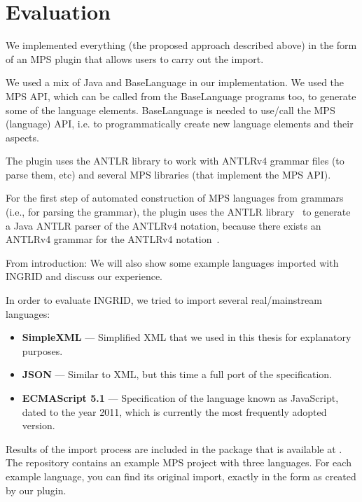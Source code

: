 \section{Evaluation}
\label{sect:EVAL}


We implemented everything (the proposed approach described above) in the form of an MPS plugin that allows users to carry out the import.

We used a mix of Java and BaseLanguage in our implementation.
We used the MPS API, which can be called from the BaseLanguage programs too, to generate some of the language elements.
BaseLanguage is needed to use/call the MPS (language) API, i.e. to programmatically create new language elements and their aspects.

The plugin uses the ANTLR library to work with ANTLRv4 grammar files (to parse them, etc) and several MPS libraries (that implement the MPS API).

For the first step of automated construction of MPS languages from grammars (i.e., for parsing the grammar), the plugin uses the ANTLR library~\cite{ref:ANTLR4} to generate a Java ANTLR parser of the ANTLRv4 notation, because there exists an ANTLRv4 grammar for the ANTLRv4 notation~\cite{ref:ANTLR4reference}.



From introduction: We will also show some example languages imported with INGRID and discuss our experience.

In order to evaluate INGRID, we tried to import several real/mainstream languages:
\begin{itemize}
	\item \textbf{SimpleXML} --- Simplified XML that we used in this thesis for explanatory purposes.
	\item \textbf{JSON} --- Similar to XML, but this time a full port of the specification.
	\item \textbf{ECMAScript 5.1} --- Specification of the language known as JavaScript, dated to the year 2011, which is currently the most frequently adopted version.
\end{itemize}
Results of the import process are included in the package that is available at .
The repository  contains an example MPS project with three languages.
For each example language, you can find its original import, exactly in the form as created by our plugin.

